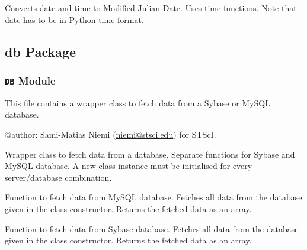 \documentclass[letterpaper,10pt,english]{sphinxmanual}
\begin{document}

\begin{fulllineitems}
\label{SamPy.dates:SamPy.dates.julians.toJulian2}
Converts date and time to Modified Julian Date.
Uses time functions. Note that date has to be in Python time format.

\end{fulllineitems}



\subsection{db Package}
\label{SamPy.db:db-package}\label{SamPy.db::doc}

\subsubsection{\texttt{DB} Module}
\label{SamPy.db:module-SamPy.db.DB}\label{SamPy.db:db-module}
This file contains a wrapper class to fetch data from a Sybase or MySQL database.

@author: Sami-Matias Niemi (\href{mailto:niemi@stsci.edu}{niemi@stsci.edu}) for STScI.


\begin{fulllineitems}
\label{SamPy.db:SamPy.db.DB.DBSMN}
Wrapper class to fetch data from a database. Separate functions
for Sybase and MySQL database. A new class instance must be
initialised for every server/database combination.


\begin{fulllineitems}
\label{SamPy.db:SamPy.db.DB.DBSMN.fetchMySQLData}
Function to fetch data from MySQL database.
Fetches all data from the database given in the class constructor.
Returns the fetched data as an array.

\end{fulllineitems}



\begin{fulllineitems}
\label{SamPy.db:SamPy.db.DB.DBSMN.fetchSybaseData}
Function to fetch data from Sybase database.
Fetches all data from the database given in the class constructor.
Returns the fetched data as an array.

\end{fulllineitems}


\end{fulllineitems}
\end{document}
